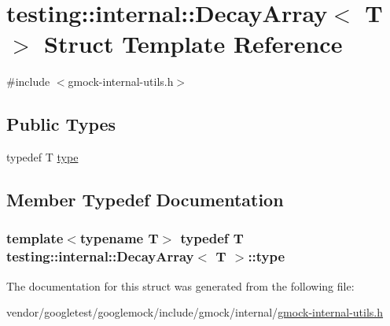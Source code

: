 \hypertarget{structtesting_1_1internal_1_1DecayArray}{}\section{testing\+:\+:internal\+:\+:Decay\+Array$<$ T $>$ Struct Template Reference}
\label{structtesting_1_1internal_1_1DecayArray}


{\ttfamily \#include $<$gmock-\/internal-\/utils.\+h$>$}

\subsection*{Public Types}
\begin{DoxyCompactItemize}
\item 
typedef T \hyperlink{structtesting_1_1internal_1_1DecayArray_a39803f9bafd56bc4531f86eb34fe9c0f}{type}
\end{DoxyCompactItemize}


\subsection{Member Typedef Documentation}
\subsubsection[{\texorpdfstring{type}{type}}]{\setlength{\rightskip}{0pt plus 5cm}template$<$typename T$>$ typedef T {\bf testing\+::internal\+::\+Decay\+Array}$<$ T $>$\+::{\bf type}}\hypertarget{structtesting_1_1internal_1_1DecayArray_a39803f9bafd56bc4531f86eb34fe9c0f}{}\label{structtesting_1_1internal_1_1DecayArray_a39803f9bafd56bc4531f86eb34fe9c0f}


The documentation for this struct was generated from the following file\+:\begin{DoxyCompactItemize}
\item 
vendor/googletest/googlemock/include/gmock/internal/\hyperlink{gmock-internal-utils_8h}{gmock-\/internal-\/utils.\+h}\end{DoxyCompactItemize}
